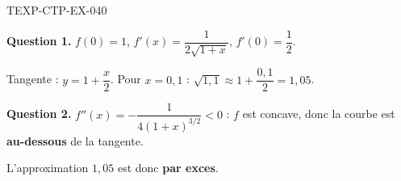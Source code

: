 \begin{corrige}{TEXP-CTP-EX-040}

\textbf{Question 1.} $f(0)=1$, $f'(x) = \dfrac{1}{2\sqrt{1+x}}$, $f'(0) = \dfrac{1}{2}$.


Tangente : $y = 1 + \dfrac{x}{2}$. Pour $x = 0{,}1$ : $\sqrt{1{,}1} \approx 1 + \dfrac{0{,}1}{2} = 1{,}05$.

\textbf{Question 2.} $f''(x) = -\dfrac{1}{4(1+x)^{3/2}} < 0$ : $f$ est concave, donc la courbe est \textbf{au-dessous} de la tangente.

L'approximation $1{,}05$ est donc \textbf{par exces}.

\end{corrige}
